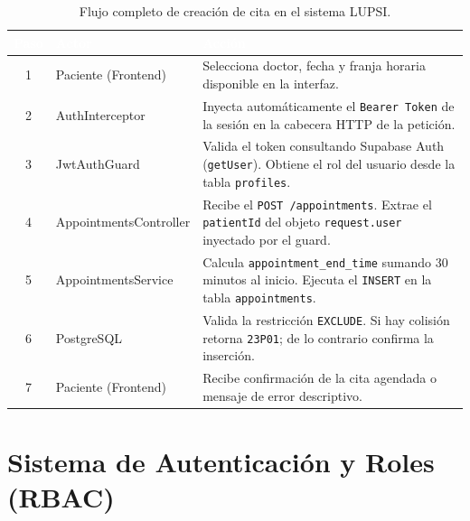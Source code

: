 \documentclass[a4paper,12pt]{article}
\renewcommand{\arraystretch}{1.1}
\begin{document}
    \begin{table}[H]
    \centering\small\renewcommand{\arraystretch}{1.5}
    \begin{tabular}{|c|p{3.5cm}|p{8cm}|}
    \hline
    \rowcolor{SKTPrimary}
    \textcolor{white}{\textbf{Paso}} & \textcolor{white}{\textbf{Actor}} & \textcolor{white}{\textbf{Acción}} \\
    \hline
    1 & Paciente (Frontend) & Selecciona doctor, fecha y franja horaria disponible en la interfaz. \\
    \hline
    2 & AuthInterceptor & Inyecta automáticamente el \texttt{Bearer Token} de la sesión en la cabecera HTTP de la petición. \\
    \hline
    3 & JwtAuthGuard & Valida el token consultando Supabase Auth (\texttt{getUser}). Obtiene el rol del usuario desde la tabla \texttt{profiles}. \\
    \hline
    4 & AppointmentsController & Recibe el \texttt{POST /appointments}. Extrae el \texttt{patientId} del objeto \texttt{request.user} inyectado por el guard. \\
    \hline
    5 & AppointmentsService & Calcula \texttt{appointment\_end\_time} sumando 30 minutos al inicio. Ejecuta el \texttt{INSERT} en la tabla \texttt{appointments}. \\
    \hline
    6 & PostgreSQL & Valida la restricción \texttt{EXCLUDE}. Si hay colisión retorna \texttt{23P01}; de lo contrario confirma la inserción. \\
    \hline
    7 & Paciente (Frontend) & Recibe confirmación de la cita agendada o mensaje de error descriptivo. \\
    \hline
    \end{tabular}
    \caption*{\footnotesize Flujo completo de creación de cita en el sistema LUPSI.}
    \end{table}

    \section{Sistema de Autenticación y Roles (RBAC)}
\end{document}
